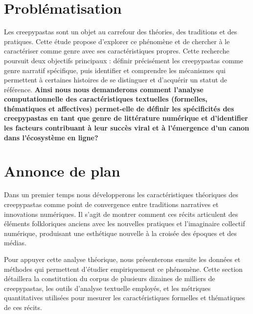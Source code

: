 \documentclass[12pt,a4paper,oneside,titlepage]{book} %
\begin{document}


\section*{Problématisation}

Les creepypastas sont un objet au carrefour des théories, des traditions et des pratiques. Cette étude propose d'explorer ce phénomène et de chercher à le caractériser comme genre avec ses caractéristiques propres. 
Cette recherche poursuit deux objectifs principaux : définir précisément les creepypastas comme genre narratif spécifique, puis identifier et comprendre les mécanismes qui permettent à certaines histoires de se distinguer et d'acquérir un statut de référence. \textbf{Ainsi nous nous demanderons comment l'analyse computationnelle des caractéristiques textuelles (formelles, thématiques et affectives) permet-elle de définir les spécificités des creepypastas en tant que genre de littérature numérique et d'identifier les facteurs contribuant à leur succès viral et à l'émergence d'un canon dans l'écosystème en ligne? }

\section*{Annonce de plan}

Dans un premier temps nous développerons les caractéristiques théoriques des creepypastas comme point de convergence entre traditions narratives et innovations numériques. Il s'agit de montrer comment ces récits articulent des éléments folkloriques anciens avec les nouvelles pratiques et l’imaginaire collectif numérique, produisant une esthétique nouvelle à la croisée des époques et des médias.

Pour appuyer cette analyse théorique, nous présenterons ensuite les données et méthodes qui permettent d'étudier empiriquement ce phénomène. Cette section détaillera la constitution du corpus de plusieurs dizaines de milliers de creepypastas, les outils d'analyse textuelle employés, et les métriques quantitatives utilisées pour mesurer les caractéristiques formelles et thématiques de ces récits.
\end{document}
